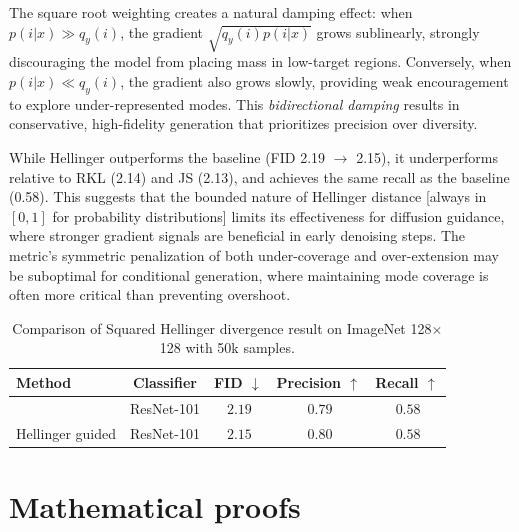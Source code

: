 \documentclass{article}
\begin{document}
The square root weighting creates a natural damping effect: when $p(i|x) \gg q_y(i)$, the gradient $\sqrt{q_y(i)p(i|x)}$ grows sublinearly, strongly discouraging the model from placing mass in low-target regions. Conversely, when $p(i|x) \ll q_y(i)$, the gradient also grows slowly, providing weak encouragement to explore under-represented modes. This \emph{bidirectional damping} results in conservative, high-fidelity generation that prioritizes precision over diversity.

While Hellinger outperforms the baseline (FID 2.19 $\to$ 2.15), it underperforms relative to RKL (2.14) and JS (2.13), and achieves the same recall as the baseline (0.58). This suggests that the bounded nature of Hellinger distance [always in $[0, 1]$ for probability distributions] limits its effectiveness for diffusion guidance, where stronger gradient signals are beneficial in early denoising steps. The metric's symmetric penalization of both under-coverage and over-extension may be suboptimal for conditional generation, where maintaining mode coverage is often more critical than preventing overshoot.

\begin{table}[h]
	\centering
    \vspace{-1em}
	\caption{Comparison of Squared Hellinger divergence result on ImageNet 128$\times$128 with 50k samples.}
	\vspace{5pt}
	\label{tab:hellinger_results}
	\begin{tabular}{lcccc}
		\toprule
		\textbf{Method} & \textbf{Classifier} &\textbf{FID} $\downarrow$ &  \textbf{Precision} $\uparrow$ & \textbf{Recall} $\uparrow$ \\
		\midrule
		\cite{ma2023elucidating} & ResNet-101 &  $\,2.19 $ &  $\,0.79 $&  $\,0.58 $\\
		Hellinger guided & ResNet-101  &  $\,2.15$ &  $\,0.80 $&  $\,0.58 $\\
		\bottomrule
	\end{tabular}
\end{table}

\section{Mathematical proofs}
\end{document}
